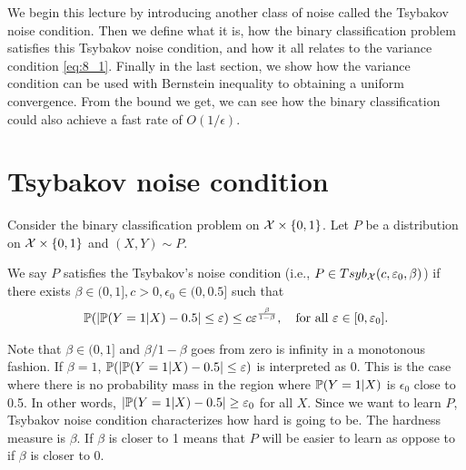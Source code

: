 \documentclass[twoside]{article}
\begin{document}
We begin this lecture by introducing another class of noise called the Tsybakov noise condition.  Then we define what it is, how the binary classification problem satisfies this Tsybakov noise condition, and how it all relates to the variance condition \cref{eq:8_1}.  Finally in the last section, we show how the variance condition can be used with Bernstein inequality to obtaining a uniform convergence.  From the bound we get, we can see how the binary classification could also achieve a fast rate of $O(1/\epsilon)$.   


\section{Tsybakov noise condition}
Consider the binary classification problem on $\mathcal{X} \times \{0,1\}$.  Let $P$ be a distribution on $\mathcal{X} \times \{0, 1\}$ and $(X,Y) \sim P$. 

\begin{definition}
    We say $P$ satisfies the Tsybakov's noise condition (i.e., $P \in Tsyb_{\mathcal{X}}(c, \varepsilon_0,\beta)$) if there exists $\beta \in (0,1], c > 0, \epsilon_0 \in (0, 0.5]$ such that 
    \begin{align}
        \mathbb{P}(| \mathbb{P}(Y=1 | X) - 0.5 | \leq \varepsilon ) \leq c \varepsilon^{\frac{\beta}{1-\beta}}, \quad \text{for all } \varepsilon \in [0, \varepsilon_0].
    \end{align}
\end{definition}
Note that $\beta \in (0, 1]$ and $\beta/1-\beta$ goes from zero is infinity in a monotonous fashion.  If $\beta = 1$, $\mathbb{P}(| \mathbb{P}(Y=1 | X) - 0.5 | \leq \varepsilon )$ is interpreted as $0$.  This is the case where there is no probability mass in the region where $\mathbb{P}(Y=1 |X)$ is $\epsilon_0$ close to 0.5.  In other words, $|\mathbb{P}(Y=1 | X) - 0.5 | \geq \varepsilon_0$ for all $X$.  Since we want to learn $P$, Tsybakov noise condition characterizes how hard is going to be.  The hardness measure is $\beta$.  If $\beta$ is closer to 1 means that $P$ will be easier to learn as oppose to if $\beta$ is closer to 0.
\end{document}
